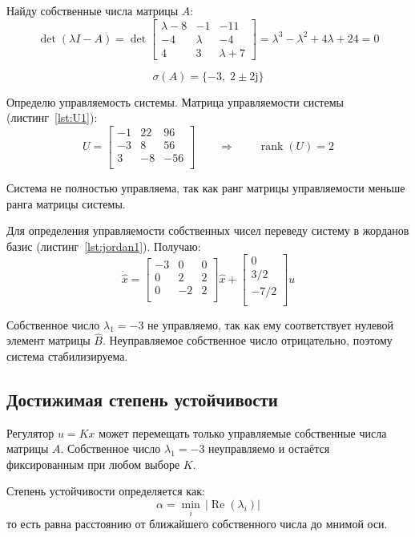 \documentclass[a4paper,12pt]{article}
\begin{document}
	Найду собственные числа матрицы \(A\):
	\[
	\operatorname{det}(\lambda I - A) = \operatorname{det}\begin{bmatrix}
		\lambda-8 & -1 & -11\\
		-4 & \lambda & -4\\
		4 & 3 & \lambda+7
	\end{bmatrix} = \lambda^3-\lambda^2+4\lambda+24 = 0
	\]
	
	\[
	\sigma(A) = \{-3,\; 2 \pm 2\mathrm{j}\}
	\]
	
	Определю управляемость системы. Матрица управляемости системы (листинг~\ref{lst:U1}):
	\[
	U = \begin{bmatrix}
		 -1 & 22 & 96 \\
		-3 & 8 & 56 \\
		3 & -8 & -56 \\
	\end{bmatrix} \qquad \Longrightarrow \qquad
	\operatorname{rank}(U) = 2
	\]
	
	Система не полностью управляема, так как ранг матрицы управляемости меньше ранга матрицы системы.
	
	Для определения управляемости собственных чисел переведу систему в жорданов базис (листинг~\ref{lst:jordan1}). Получаю:
	\[
	\dot{\hat x} = \begin{bmatrix}
		-3 & 0 & 0 \\
		0 & 2 & 2 \\
		0 & -2 & 2 \\
	\end{bmatrix} \hat x + \begin{bmatrix}
		0 \\ 3/2 \\ -7/2 \\
	\end{bmatrix} u
	\]
	
	Собственное число \(\lambda_1 = -3\) не управляемо, так как ему соответствует нулевой элемент матрицы \(\hat B\). Неуправляемое собственное число отрицательно, поэтому система стабилизируема.	
	
	\subsection{Достижимая степень устойчивости}
	
	Регулятор $u = Kx$ может перемещать только управляемые собственные 
	числа матрицы $A$. Собственное число $\lambda_1 = -3$ неуправляемо 
	и остаётся фиксированным при любом выборе $K$.
	
	Степень устойчивости определяется как:
	\[
	\alpha = \min_i \, |\operatorname{Re}(\lambda_i)|
	\]
	то есть равна расстоянию от ближайшего собственного числа до мнимой оси.
	
\end{document}
